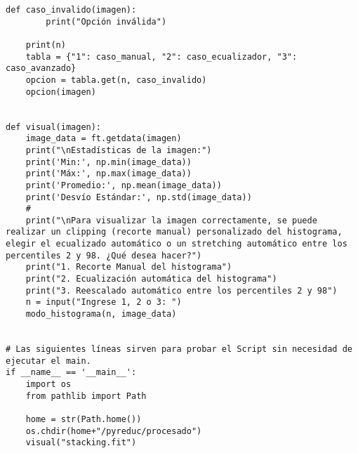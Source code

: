 \begin{lstlisting}[style=python]
    def caso_invalido(imagen):
        print("Opción inválida")

    print(n)    
    tabla = {"1": caso_manual, "2": caso_ecualizador, "3": caso_avanzado}
    opcion = tabla.get(n, caso_invalido)
    opcion(imagen)
    

def visual(imagen):
    image_data = ft.getdata(imagen)
    print("\nEstadísticas de la imagen:")
    print('Min:', np.min(image_data))
    print('Máx:', np.max(image_data))
    print('Promedio:', np.mean(image_data))
    print('Desvío Estándar:', np.std(image_data))
    #
    print("\nPara visualizar la imagen correctamente, se puede realizar un clipping (recorte manual) personalizado del histograma, elegir el ecualizado automático o un stretching automático entre los percentiles 2 y 98. ¿Qué desea hacer?")
    print("1. Recorte Manual del histograma")
    print("2. Ecualización automática del histograma")
    print("3. Reescalado automático entre los percentiles 2 y 98")
    n = input("Ingrese 1, 2 o 3: ")
    modo_histograma(n, image_data)

    
# Las siguientes líneas sirven para probar el Script sin necesidad de ejecutar el main.
if __name__ == '__main__':
    import os
    from pathlib import Path
    
    home = str(Path.home())
    os.chdir(home+"/pyreduc/procesado")
    visual("stacking.fit")
\end{lstlisting}